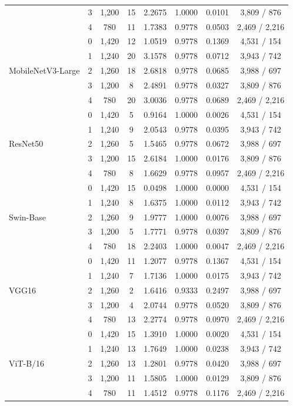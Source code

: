 \documentclass[11pt]{article}
\begin{document}
\begin{table}[htbp]
\begin{tabular*}{\textwidth}{@{\extracolsep{\fill}}lccccccc@{}}
 & 3 & 1,200 & 15 & 2.2675 & 1.0000 & 0.0101 & 3,809 / 876 \\
 & 4 & 780 & 11 & 1.7383 & 0.9778 & 0.0503 & 2,469 / 2,216 \\
\midrule
\multirow{5}{*}{MobileNetV3-Large} & 0 & 1,420 & 12 & 1.0519 & 0.9778 & 0.1369 & 4,531 / 154 \\
 & 1 & 1,240 & 20 & 3.1578 & 0.9778 & 0.0712 & 3,943 / 742 \\
 & 2 & 1,260 & 18 & 2.6818 & 0.9778 & 0.0685 & 3,988 / 697 \\
 & 3 & 1,200 & 8 & 2.4891 & 0.9778 & 0.0327 & 3,809 / 876 \\
 & 4 & 780 & 20 & 3.0036 & 0.9778 & 0.0689 & 2,469 / 2,216 \\
\midrule
\multirow{5}{*}{ResNet50} & 0 & 1,420 & 5 & 0.9164 & 1.0000 & 0.0026 & 4,531 / 154 \\
 & 1 & 1,240 & 9 & 2.0543 & 0.9778 & 0.0395 & 3,943 / 742 \\
 & 2 & 1,260 & 5 & 1.5465 & 0.9778 & 0.0672 & 3,988 / 697 \\
 & 3 & 1,200 & 15 & 2.6184 & 1.0000 & 0.0176 & 3,809 / 876 \\
 & 4 & 780 & 8 & 1.6629 & 0.9778 & 0.0957 & 2,469 / 2,216 \\
\midrule
\multirow{5}{*}{Swin-Base} & 0 & 1,420 & 15 & 0.0498 & 1.0000 & 0.0000 & 4,531 / 154 \\
 & 1 & 1,240 & 8 & 1.6375 & 1.0000 & 0.0112 & 3,943 / 742 \\
 & 2 & 1,260 & 9 & 1.9777 & 1.0000 & 0.0076 & 3,988 / 697 \\
 & 3 & 1,200 & 5 & 1.7771 & 0.9778 & 0.0397 & 3,809 / 876 \\
 & 4 & 780 & 18 & 2.2403 & 1.0000 & 0.0047 & 2,469 / 2,216 \\
\midrule
\multirow{5}{*}{VGG16} & 0 & 1,420 & 11 & 1.2077 & 0.9778 & 0.1367 & 4,531 / 154 \\
 & 1 & 1,240 & 7 & 1.7136 & 1.0000 & 0.0175 & 3,943 / 742 \\
 & 2 & 1,260 & 2 & 1.6416 & 0.9333 & 0.2497 & 3,988 / 697 \\
 & 3 & 1,200 & 4 & 2.0744 & 0.9778 & 0.0520 & 3,809 / 876 \\
 & 4 & 780 & 13 & 2.2774 & 0.9778 & 0.0970 & 2,469 / 2,216 \\
\midrule
\multirow{5}{*}{ViT-B/16} & 0 & 1,420 & 15 & 1.3910 & 1.0000 & 0.0020 & 4,531 / 154 \\
 & 1 & 1,240 & 13 & 1.7649 & 1.0000 & 0.0238 & 3,943 / 742 \\
 & 2 & 1,260 & 13 & 1.2801 & 0.9778 & 0.0420 & 3,988 / 697 \\
 & 3 & 1,200 & 11 & 1.5805 & 1.0000 & 0.0129 & 3,809 / 876 \\
 & 4 & 780 & 11 & 1.4512 & 0.9778 & 0.1176 & 2,469 / 2,216 \\
\bottomrule
\end{tabular*}
\end{table}
\end{document}
